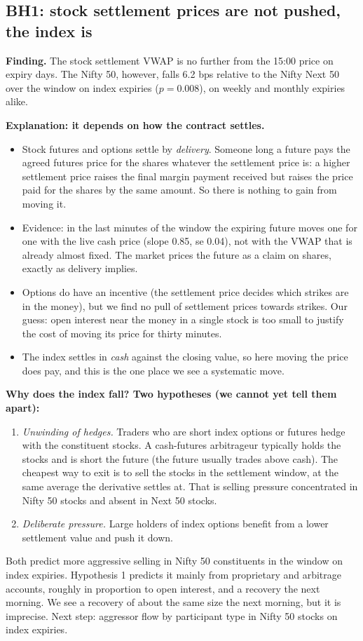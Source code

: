 \documentclass[11pt]{article}
\begin{document}
\subsection*{BH1: stock settlement prices are not pushed, the index is}
\textbf{Finding.} The stock settlement VWAP is no further from the 15:00 price on expiry days.
The Nifty 50, however, falls 6.2 bps relative to the Nifty Next 50 over the window on index
expiries ($p=0.008$), on weekly and monthly expiries alike.

\textbf{Explanation: it depends on how the contract settles.}
\begin{itemize}
  \item Stock futures and options settle by \emph{delivery}. Someone long a future pays the
  agreed futures price for the shares whatever the settlement price is: a higher settlement
  price raises the final margin payment received but raises the price paid for the shares by
  the same amount. So there is nothing to gain from moving it.
  \item Evidence: in the last minutes of the window the expiring future moves one for one with
  the live cash price (slope 0.85, se 0.04), not with the VWAP that is already almost fixed. The market
  prices the future as a claim on shares, exactly as delivery implies.
  \item Options do have an incentive (the settlement price decides which strikes are in the
  money), but we find no pull of settlement prices towards strikes. Our guess: open interest
  near the money in a single stock is too small to justify the cost of moving its price for
  thirty minutes.
  \item The index settles in \emph{cash} against the closing value, so here moving the price
  does pay, and this is the one place we see a systematic move.
\end{itemize}

\textbf{Why does the index fall? Two hypotheses (we cannot yet tell them apart):}
\begin{enumerate}
  \item \emph{Unwinding of hedges.} Traders who are short index options or futures hedge with
  the constituent stocks. A cash-futures arbitrageur typically holds the stocks and is short
  the future (the future usually trades above cash). The cheapest way to exit is to sell the
  stocks in the settlement window, at the same average the derivative settles at. That is
  selling pressure concentrated in Nifty 50 stocks and absent in Next 50 stocks.
  \item \emph{Deliberate pressure.} Large holders of index options benefit from a lower
  settlement value and push it down.
\end{enumerate}
Both predict more aggressive selling in Nifty 50 constituents in the window on index expiries.
Hypothesis 1 predicts it mainly from proprietary and arbitrage accounts, roughly in proportion to
open interest, and a recovery the next morning. We see a recovery of about the same size the
next morning, but it is imprecise. Next step: aggressor flow by participant type in Nifty 50
stocks on index expiries.
\end{document}
